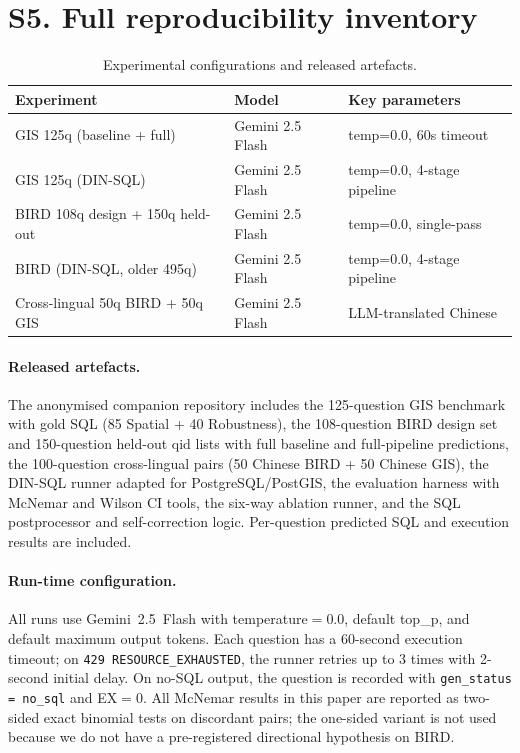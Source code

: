 \documentclass[11pt]{article}
\begin{document}
\section*{S5. Full reproducibility inventory}

\begin{table}[h]
\centering\small
\caption{Experimental configurations and released artefacts.}
\label{tab:repro-supp}
{\setlength{\tabcolsep}{4pt}
\begin{tabular}{lll}
\toprule
Experiment & Model & Key parameters \\
\midrule
GIS 125q (baseline + full) & Gemini 2.5 Flash & temp=0.0, 60s timeout \\
GIS 125q (DIN-SQL) & Gemini 2.5 Flash & temp=0.0, 4-stage pipeline \\
BIRD 108q design + 150q held-out & Gemini 2.5 Flash & temp=0.0, single-pass \\
BIRD (DIN-SQL, older 495q) & Gemini 2.5 Flash & temp=0.0, 4-stage pipeline \\
Cross-lingual 50q BIRD + 50q GIS & Gemini 2.5 Flash & LLM-translated Chinese \\
\bottomrule
\end{tabular}
}
\end{table}

\paragraph{Released artefacts.} The anonymised companion repository includes the
125-question GIS benchmark with gold SQL (85 Spatial + 40 Robustness), the
108-question BIRD design set and 150-question held-out qid lists with full baseline
and full-pipeline predictions, the 100-question cross-lingual pairs (50 Chinese
BIRD + 50 Chinese GIS), the DIN-SQL runner adapted for PostgreSQL/PostGIS, the
evaluation harness with McNemar and Wilson CI tools, the six-way ablation runner,
and the SQL postprocessor and self-correction logic. Per-question predicted SQL
and execution results are included.

\paragraph{Run-time configuration.} All runs use Gemini~2.5~Flash with
temperature$=0.0$, default top\_p, and default maximum output tokens. Each question
has a 60-second execution timeout; on \texttt{429 RESOURCE\_\allowbreak{}EXHAUSTED}, the runner
retries up to 3 times with 2-second initial delay. On no-SQL output, the question
is recorded with \texttt{gen\_status = no\_sql} and EX$=0$. All McNemar results
in this paper are reported as two-sided exact binomial tests on discordant pairs;
the one-sided variant is not used because we do not have a pre-registered
directional hypothesis on BIRD.
\end{document}
